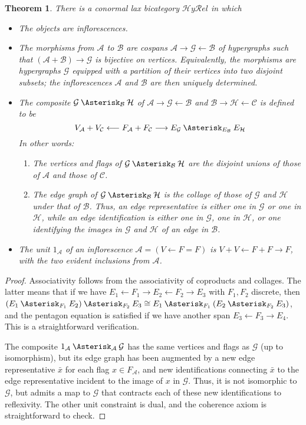 \documentclass{article}
\newtheorem{thm}{Theorem}[section]
\theoremstyle{definition}
\theoremstyle{remark}
\def\A{\mathcal{A}}
\def\B{\mathcal{B}}
\def\C{\mathcal{C}}
\def\G{\mathcal{G}}
\def\H{\mathcal{H}}
\let\ot\leftarrow
\def\hyrel{\mathcal{H}\mathit{y}\mathcal{R}\mathit{el}}
\def\coll{\mathbin{\Asterisk}}
\begin{document}
\begin{thm}\label{thm:hyrel}
  There is a conormal lax bicategory $\hyrel$ in which
  \begin{itemize}
  \item The objects are inflorescences.
  \item The morphisms from $\A$ to $\B$ are cospans $\A \to \G \ot \B$ of hypergraphs such that $(\A+\B) \to \G$ is bijective on vertices.
    Equivalently, the morphisms are hypergraphs $\G$ equipped with a partition of their vertices into two disjoint subsets; the inflorescences $\A$ and $\B$ are then uniquely determined.
  \item The composite $\G \coll_{\B} \H$ of $\A \to \G \ot \B$ and $\B \to \H \ot \C$ is defined to be
    \[ V_{\A}  + V_{\C} \longleftarrow F_{\A} + F_{\C} \longrightarrow E_{\G} \coll_{E_\B} E_{\H} \]
    In other words:
    \begin{enumerate}
    \item The vertices and flags of $\G \coll_{\B} \H$ are the disjoint unions of those of $\A$ and those of $\C$.
    \item The edge graph of $\G \coll_{\B} \H$ is the collage of those of $\G$ and $\H$ under that of $\B$.
      Thus, an edge representative is either one in $\G$ or one in $\H$, while an edge identification is either one in $\G$, one in $\H$, or one identifying the images in $\G$ and $\H$ of an edge in $\B$.
    \end{enumerate}
  \item The unit $1_{\A}$ of an inflorescence $\A=(V\ot F = F)$ is $V+V \ot F+F \to F$, with the two evident inclusions from $\A$.
  \end{itemize}
\end{thm}
\begin{proof}
  Associativity follows from the associativity of coproducts and collages.
  The latter means that if we have $E_1 \ot F_1 \to E_2 \ot F_2 \to E_3$ with $F_1,F_2$ discrete, then $(E_1 \coll_{F_1} E_2) \coll_{F_2} E_3 \cong E_1 \coll_{F_1} (E_2 \coll_{F_2} E_3)$, and the pentagon equation is satisfied if we have another span $E_3 \ot F_3 \to E_4$.
  This is a straightforward verification.

  The composite $1_{\A} \coll_{\A} \G$ has the same vertices and flags as $\G$ (up to isomorphism), but its edge graph has been augmented by a new edge representative $\bar{x}$ for each flag $x\in F_{\A}$, and new identifications connecting $\bar{x}$ to the edge representative incident to the image of $x$ in $\G$.
  Thus, it is not isomorphic to $\G$, but admits a map to $\G$ that contracts each of these new identifications to reflexivity.
  The other unit constraint is dual, and the coherence axiom is straightforward to check.
\end{proof}
\end{document}
